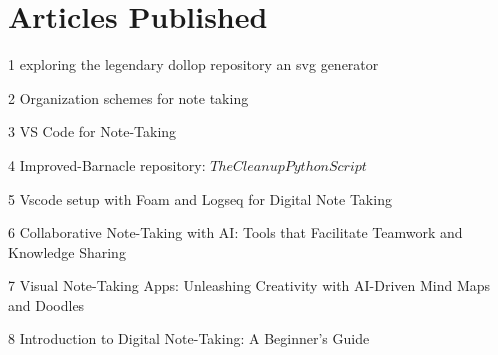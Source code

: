 \documentclass[fontsize=11pt]{tccv}
\begin{document}
\section{Articles Published} 

\begin{publi}

    \item{1} {exploring the legendary dollop repository an svg generator} \vspace{1em}
    \item{2} {Organization schemes for note taking} \vspace{1em}
    \item{3} {VS Code for Note-Taking} \vspace{1em}
    \item{4} {Improved-Barnacle repository: \(The Cleanup Python Script\)} \vspace{1em}
    \item{5} {Vscode setup with Foam and Logseq for Digital Note Taking} \vspace{1em}
    \item{6} {Collaborative Note-Taking with AI: Tools that Facilitate Teamwork and Knowledge Sharing} \vspace{1em}
    \item{7} {Visual Note-Taking Apps: Unleashing Creativity with AI-Driven Mind Maps and Doodles} \vspace{1em}
    \item{8} {Introduction to Digital Note-Taking: A Beginner's Guide}\vspace{1em}
   
\end{publi}
\vspace{2em}

\end{document}
